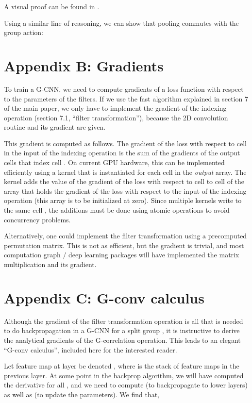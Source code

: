 \documentclass{article}
\begin{document}
A visual proof can be found in \cite{Dieleman2016}.

Using a similar line of reasoning, we can show that pooling commutes with the group action:



\section*{Appendix B: Gradients}

To train a G-CNN, we need to compute gradients of a loss function with respect to the parameters of the filters.
If we use the fast algorithm explained in section 7 of the main paper, we only have to implement the gradient of the indexing operation (section 7.1, ``filter transformation''), because the 2D convolution routine and its gradient are given.

This gradient is computed as follows.
The gradient of the loss with respect to cell  in the input of the indexing operation is the sum of the gradients of the output cells  that index cell .
On current GPU hardware, this can be implemented efficiently using a kernel that is instantiated for each cell  in the \emph{output} array.
The kernel adds the value of the gradient of the loss with respect to cell  to cell  of the array that holds the gradient of the loss with respect to the input of the indexing operation (this array is to be initialized at zero).
Since multiple kernels write to the same cell , the additions must be done using atomic operations to avoid concurrency problems.

Alternatively, one could implement the filter transformation using a precomputed permutation matrix.
This is not as efficient, but the gradient is trivial, and most computation graph / deep learning packages will have implemented the matrix multiplication and its gradient.


\section*{Appendix C: G-conv calculus}

Although the gradient of the filter transformation operation is all that is needed to do backpropagation in a G-CNN for a split group , it is instructive to derive the analytical gradients of the G-correlation operation.
This leads to an elegant ``G-conv calculus'', included here for the interested reader.

Let feature map  at layer  be denoted , where  is the stack of feature maps in the previous layer.
At some point in the backprop algorithm, we will have computed the derivative  for all , and we need to compute  (to backpropagate to lower layers) as well as  (to update the parameters).
We find that,
\end{document}
